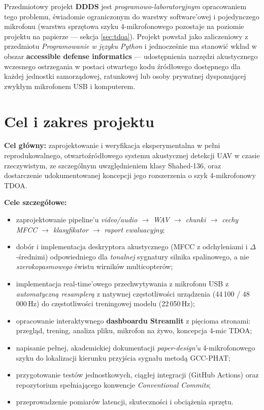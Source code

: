 \documentclass[11pt,a4paper]{article}
\newcommand{\sectionref}[1]{sekcja \ref{#1}}
\begin{document}
Przedmiotowy projekt \textbf{DDDS} jest \emph{programowo-laboratoryjnym}
opracowaniem tego problemu, świadomie ograniczonym do warstwy software'owej i
pojedynczego mikrofonu (warstwa sprzętowa szyku 4-mikrofonowego pozostaje na
poziomie projektu na papierze --- \sectionref{sec:tdoa}). Projekt powstał jako
zaliczeniowy z przedmiotu \emph{Programowanie w języku Python} i jednocześnie ma
stanowić wkład w obszar \textbf{accessible defense informatics} ---
udostępnienia narzędzi akustycznego wczesnego ostrzegania w postaci otwartego
kodu źródłowego dostępnego dla każdej jednostki samorządowej, ratunkowej lub
osoby prywatnej dysponującej zwykłym mikrofonem USB i komputerem.

\section{Cel i zakres projektu}

\textbf{Cel główny:} zaprojektowanie i weryfikacja eksperymentalna w pełni
reprodukowalnego, otwartoźródłowego systemu akustycznej detekcji UAV w czasie
rzeczywistym, ze szczególnym uwzględnieniem klasy Shahed-136, oraz dostarczenie
udokumentowanej koncepcji jego rozszerzenia o szyk 4-mikrofonowy TDOA.

\textbf{Cele szczegółowe:}
\begin{itemize}[noitemsep]
  \item zaprojektowanie pipeline'u \emph{video/audio $\rightarrow$ WAV
        $\rightarrow$ chunki $\rightarrow$ cechy MFCC $\rightarrow$ klasyfikator
        $\rightarrow$ raport ewaluacyjny};
  \item dobór i implementacja deskryptora akustycznego (MFCC z odchyleniami i
        $\Delta$-średnimi) odpowiedniego dla \emph{tonalnej} sygnatury silnika
        spalinowego, a nie \emph{szerokopasmowego} świstu wirników multicopterów;
  \item implementacja real-time'owego przechwytywania z mikrofonu USB z
        \emph{automatyczną resamplerą} z natywnej częstotliwości urządzenia
        (44\,100 / 48\,000\,Hz) do częstotliwości treningowej modelu
        (22\,050\,Hz);
  \item opracowanie interaktywnego \textbf{dashboardu Streamlit} z pięcioma
        stronami: przegląd, trening, analiza pliku, mikrofon na żywo, koncepcja
        4-mic TDOA;
  \item napisanie pełnej, akademickiej dokumentacji \emph{paper-design'u}
        4-mikrofonowego szyku do lokalizacji kierunku przyjścia sygnału metodą
        GCC-PHAT;
  \item przygotowanie testów jednostkowych, ciągłej integracji (GitHub Actions)
        oraz repozytorium spełniającego konwencje \emph{Conventional Commits};
  \item przeprowadzenie pomiarów latencji, skuteczności i obciążenia sprzętu.
\end{itemize}
\end{document}
